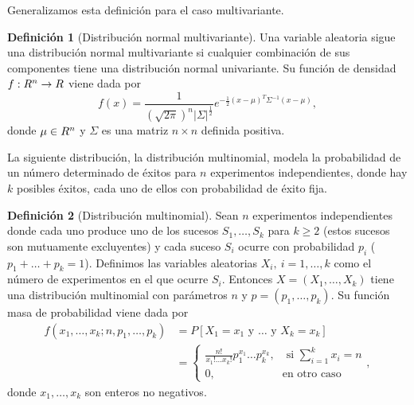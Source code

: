 \documentclass[12pt,a4paper]{report} %
\theoremstyle{definition}
\newtheorem{definition}{Definición}[section]
\begin{document}
Generalizamos esta definición para el caso multivariante.\\

\begin{definition}[Distribución normal multivariante]
  Una variable aleatoria sigue una distribución normal multivariante si cualquier combinación de sus componentes tiene una distribución normal univariante. Su función de densidad $f:\relax{R}^n\to\relax{R}$ viene dada por \[
f(x) = \frac{1}{\left (\sqrt{2\pi}\right )^n |\Sigma|^{\frac{1}{2}}} e^{-\frac{1}{2}(x-\mu)^T\Sigma^{-1}(x-\mu)},
  \] donde $\mu\in \relax{R}^n$ y $\Sigma$ es una matriz $n\times n$ definida positiva.\\
\end{definition}

La siguiente distribución, la distribución multinomial, modela la probabilidad de un número determinado de éxitos para $n$ experimentos independientes, donde hay $k$ posibles éxitos, cada uno de ellos con probabilidad de éxito fija.\\

\begin{definition}[Distribución multinomial]
 Sean $n$ experimentos independientes donde cada uno produce uno de los sucesos $S_1,\dots,S_k$ para $k\geq 2$ (estos sucesos son mutuamente excluyentes) y cada suceso $S_i$ ocurre con probabilidad $p_i$ ($p_1+\dots+p_k = 1$). Definimos las variables aleatorias $X_i,\ i=1,\dots,k$ como el número de experimentos en el que ocurre $S_i$. Entonces $X=(X_1,\dots,X_k)$ tiene una distribución multinomial con parámetros $n$ y $p = (p_1,\dots, p_k)$. Su función masa de probabilidad viene dada por
\begin{align*}
f(x_1,\dots,x_k; n, p_1,\dots,p_k) &= P[X_1 = x_1\text{ y } \dots \text{ y } X_k = x_k]\\[3pt] &=
\begin{cases}
    \frac{n!}{x_1!\dots x_k!} p_1^{x_1} \dots  p_k^{x_k},\quad\text{si } \sum_{i=1}^kx_i = n\\
    0, \qquad \qquad \qquad\text{en otro caso}
\end{cases},
\end{align*}
donde $x_1,\dots, x_k$ son enteros no negativos.\\
\end{definition}

\end{document}
